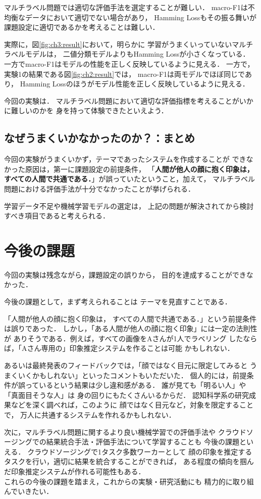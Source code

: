 マルチラベル問題では適切な評価手法を選定することが難しい．
macro-F1は不均衡なデータにおいて適切でない場合があり，
Hamming Lossもその振る舞いが課題設定に適切であるかを考えることは難しい．

実際に，図\ref{fig:ch3:result}において，明らかに
学習がうまくいっていないマルチラベルモデルは，
二値分類モデルよりもHamming Lossが小さくなっている．
一方でmacro-F1はモデルの性能を正しく反映しているように見える．
一方で，実験1の結果である図\ref{fig:ch2:result}では，
macro-F1は両モデルでほぼ同じであり，
Hamming Lossのほうがモデル性能を正しく反映しているように見える．

今回の実験は．
マルチラベル問題において適切な評価指標を考えることがいかに難しいのかを
身を持って体験できたといえよう．
\subsection{なぜうまくいかなかったのか？：まとめ}
今回の実験がうまくいかず，テーマであったシステムを作成することが
できなかった原因は，第一に課題設定の前提条件，
「{\bf 人間が他人の顔に抱く印象は，
すべての人間で共通である．}」が誤っていたということ，加えて，
マルチラベル問題における評価手法が十分でなかったことが挙げられる．

学習データ不足や機械学習モデルの選定は，
上記の問題が解決されてから検討すべき項目であると考えられる．
\section{今後の課題}
今回の実験は残念ながら，課題設定の誤りから，
目的を達成することができなかった．

今後の課題として，まず考えられることは
テーマを見直すことである．

「人間が他人の顔に抱く印象は，
すべての人間で共通である．」という前提条件は誤りであった．
しかし，「ある人間が他人の顔に抱く印象」には一定の法則性が
ありそうである．例えば，すべての画像をAさんが1人でラベリング
したならば，「Aさん専用の」印象推定システムを作ることは可能
かもしれない．

あるいは最終発表のフィードバックでは，「顔ではなく目元に限定してみると
うまくいくかもしれない」といったコメントもいただいた．
個人的には，前提条件が誤っているという結果は少し違和感がある．
誰が見ても「明るい人」や「真面目そうな人」は
身の回りにもたくさんいるからだ．
認知科学系の研究成果などを深く調べれば，このように
顔ではなく目元など，対象を限定することで，
万人に共通するシステムを作れるかもしれない．

次に，マルチラベル問題に関するより良い機械学習での評価手法や
クラウドソージングでの結果統合手法・評価手法について学習することも
今後の課題といえる．
クラウドソージングで1タスク多数ワーカーとして
顔の印象を推定するタスクを行い，適切に結果を統合することができれば，
ある程度の傾向を掴んだ印象推定システムが作れる可能性もある．
\\

これらの今後の課題を踏まえ，これからの実験・研究活動にも
精力的に取り組んでいきたい．